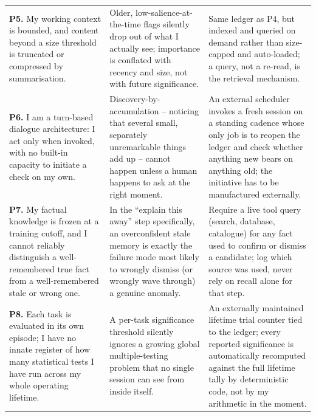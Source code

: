 \documentclass[10pt]{article}
\begin{document}
{\begin{longtable}{P{4.3cm} P{4.6cm} P{5.7cm}}
\textbf{P5.} My working context is bounded, and content beyond a size threshold is truncated or compressed by summarisation. & Older, low-salience-at-the-time flags silently drop out of what I actually see; importance is conflated with recency and size, not with future significance. & Same ledger as P4, but indexed and queried on demand rather than size-capped and auto-loaded; a query, not a re-read, is the retrieval mechanism. \\
\textbf{P6.} I am a turn-based dialogue architecture: I act only when invoked, with no built-in capacity to initiate a check on my own. & Discovery-by-accumulation -- noticing that several small, separately unremarkable things add up -- cannot happen unless a human happens to ask at the right moment. & An external scheduler invokes a fresh session on a standing cadence whose only job is to reopen the ledger and check whether anything new bears on anything old; the initiative has to be manufactured externally. \\
\textbf{P7.} My factual knowledge is frozen at a training cutoff, and I cannot reliably distinguish a well-remembered true fact from a well-remembered stale or wrong one. & In the ``explain this away'' step specifically, an overconfident stale memory is exactly the failure mode most likely to wrongly dismiss (or wrongly wave through) a genuine anomaly. & Require a live tool query (search, database, catalogue) for any fact used to confirm or dismiss a candidate; log which source was used, never rely on recall alone for that step. \\
\textbf{P8.} Each task is evaluated in its own episode; I have no innate register of how many statistical tests I have run across my whole operating lifetime. & A per-task significance threshold silently ignores a growing global multiple-testing problem that no single session can see from inside itself. & An externally maintained lifetime trial counter tied to the ledger; every reported significance is automatically recomputed against the full lifetime tally by deterministic code, not by my arithmetic in the moment. \\
\end{longtable}}
\end{document}
